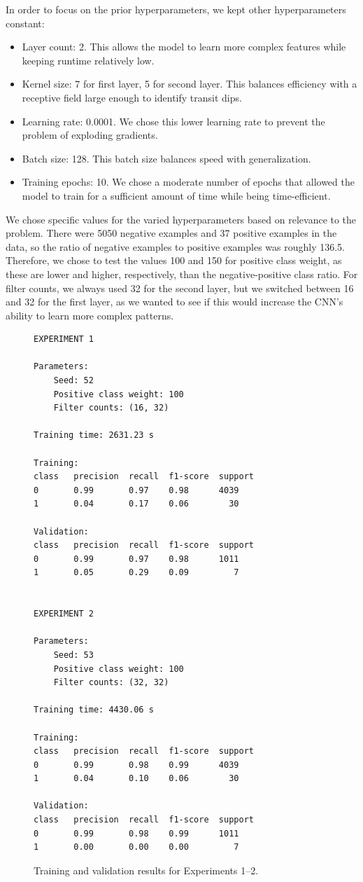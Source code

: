 \documentclass[conference]{IEEEtran}
\begin{document}
In order to focus on the prior hyperparameters, we kept other hyperparameters constant:
\begin{itemize}
\item Layer count: 2. This allows the model to learn more complex features while keeping runtime relatively low.
\item Kernel size: 7 for first layer, 5 for second layer. This balances efficiency with a receptive field large enough to identify transit dips.
\item Learning rate: 0.0001. We chose this lower learning rate to prevent the problem of exploding gradients.
\item Batch size: 128. This batch size balances speed with generalization.
\item Training epochs: 10. We chose a moderate number of epochs that allowed the model to train for a sufficient amount of time while being time-efficient.
\end{itemize}

We chose specific values for the varied hyperparameters based on relevance to the problem. There were 5050 negative examples and 37 positive examples in the data, so the ratio of negative examples to positive examples was roughly 136.5. Therefore, we chose to test the values 100 and 150 for positive class weight, as these are lower and higher, respectively, than the negative-positive class ratio. For filter counts, we always used 32 for the second layer, but we switched between 16 and 32 for the first layer, as we wanted to see if this would increase the CNN's ability to learn more complex patterns.

\begin{figure}[t]
\centering
\footnotesize

\begin{verbatim}
EXPERIMENT 1

Parameters:
    Seed: 52
    Positive class weight: 100
    Filter counts: (16, 32)

Training time: 2631.23 s

Training:
class   precision  recall  f1-score  support
0       0.99       0.97    0.98      4039
1       0.04       0.17    0.06        30

Validation:
class   precision  recall  f1-score  support
0       0.99       0.97    0.98      1011
1       0.05       0.29    0.09         7


EXPERIMENT 2

Parameters:
    Seed: 53
    Positive class weight: 100
    Filter counts: (32, 32)

Training time: 4430.06 s

Training:
class   precision  recall  f1-score  support
0       0.99       0.98    0.99      4039
1       0.04       0.10    0.06        30

Validation:
class   precision  recall  f1-score  support
0       0.99       0.98    0.99      1011
1       0.00       0.00    0.00         7
\end{verbatim}

\caption{Training and validation results for Experiments 1–2.}
\label{fig:experiments_train_val_12}
\end{figure}
\end{document}
